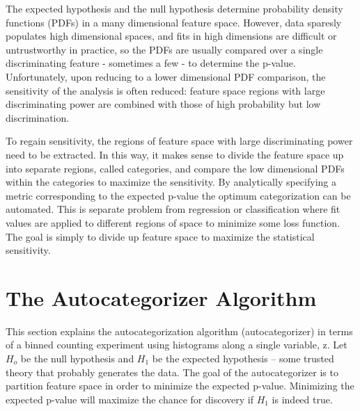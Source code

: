 \documentclass[review]{elsarticle}
\begin{document}
The expected hypothesis and the null hypothesis determine probability density functions (PDFs) in a many dimensional feature space. However, data sparesly populates high dimensional spaces, and fits in high dimensions are difficult or untrustworthy in practice, so the PDFs are usually compared over a single discriminating feature - sometimes a few - to determine the p-value. Unfortunately, upon reducing to a lower dimensional PDF comparison, the sensitivity of the analysis is often reduced: feature space regions with large discriminating power are combined with those of high probability but low discrimination.

To regain sensitivity, the regions of feature space with large discriminating power need to be extracted. In this way, it makes sense to divide the feature space up into separate regions, called categories, and compare the low dimensional PDFs within the categories to maximize the sensitivity. By analytically specifying a metric corresponding to the expected p-value the optimum categorization can be automated. This is separate problem from regression or classification where fit values are applied to different regions of space to minimize some loss function. The goal is simply to divide up feature space to maximize the statistical sensitivity.

\section{The Autocategorizer Algorithm}
This section explains the autocategorization algorithm (autocategorizer) in terms of a binned counting experiment using histograms along a single variable, z. Let $H_o$ be the null hypothesis and $H_1$ be the expected hypothesis -- some trusted theory that probably generates the data. The goal of the autocategorizer is to partition feature space in order to minimize the expected p-value. Minimizing the expected p-value will maximize the chance for discovery if $H_1$ is indeed true.   
\end{document}
